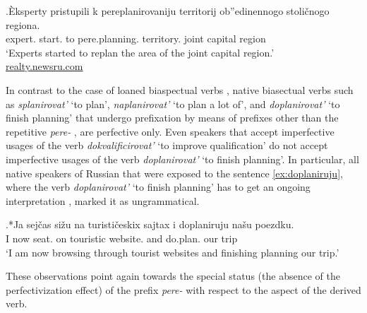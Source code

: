 \exg.\label{ex:pereplanirovanie}\`{E}ksperty pristupili k pereplanirovaniju territorij ob''edinennogo stoli\v{c}nogo regiona.\\
expert. start. to pere.planning. territory. joint capital region\\
\trans `Experts started to replan the area of the joint capital region.'\\\hbox{}\hfill\hbox{\url{realty.newsru.com}}

In contrast to the case of loaned   biaspectual verbs  , native biasectual verbs such as \textit{splanirovat'} `to plan', \textit{naplanirovat'} `to plan a lot of', and \textit{doplanirovat'} `to finish planning' that undergo prefixation  by means of prefixes other than the repetitive  \textit{pere-}  , are perfective only. Even speakers that accept imperfective usages of the verb \textit{dokvalificirovat'} `to improve qualification' do not accept imperfective usages of the verb \textit{doplanirovat'} `to finish planning'. In particular, all native speakers of Russian that were exposed to the sentence \ref{ex:doplaniruju}, where the verb \textit{doplanirovat'} `to finish planning' has to get an ongoing interpretation , marked it as ungrammatical.

\exg.*Ja sej\v{c}as si\v{z}u na turisti\v{c}eskix sajtax i doplaniruju na\v{s}u poezdku.\label{ex:doplaniruju}\\
I now seat. on touristic website. and do.plan. our trip\\
\trans `I am now browsing through tourist websites and finishing planning our trip.'\largerpage

These observations point again towards the special status (the absence of the perfectivization   effect) of the prefix \textit{pere-}   with respect to the aspect of the derived verb.

